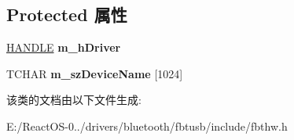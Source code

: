 \subsection*{Protected 属性}
\begin{DoxyCompactItemize}
\item 
\mbox{\label{class_c_b_t_h_w_a674aa9e31b25e2939e6171ead7e3654b}} 
\hyperlink{interfacevoid}{H\+A\+N\+D\+LE} {\bfseries m\+\_\+h\+Driver}
\item 
\mbox{\label{class_c_b_t_h_w_af8601942d01b6e7c85fa064d6dfca6eb}} 
T\+C\+H\+AR {\bfseries m\+\_\+sz\+Device\+Name} \mbox{[}1024\mbox{]}
\end{DoxyCompactItemize}


该类的文档由以下文件生成\+:\begin{DoxyCompactItemize}
\item 
E\+:/\+React\+O\+S-\/0../drivers/bluetooth/fbtusb/include/fbthw.\+h\end{DoxyCompactItemize}
